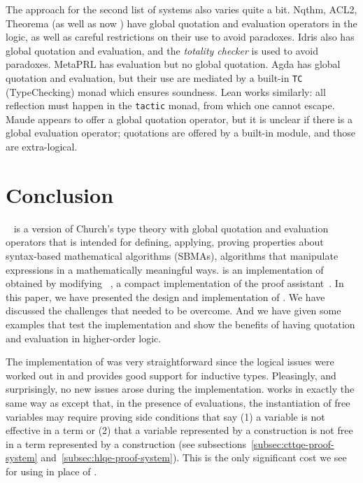 \documentclass[fleqn]{llncs}
\begin{document}
The approach for the second list of systems also varies quite a bit.
Nqthm, ACL2, Theorema (as well as now \HLQE) have global quotation
and evaluation operators in the logic, as well as careful restrictions
on their use to avoid paradoxes. Idris also has global quotation and
evaluation, and the \emph{totality checker} is used to avoid
paradoxes. MetaPRL has evaluation but no global quotation. Agda
has global quotation and evaluation, but their use are mediated by
a built-in \texttt{TC} (TypeChecking) monad which ensures soundness.
Lean works similarly: all reflection must happen in the \texttt{tactic}
monad, from which one cannot escape. Maude appears to offer a global
quotation operator, but it is unclear if there is a global evaluation
operator; quotations are offered by a built-in module, and those are
extra-logical.

\section{Conclusion}\label{sec:conclusion}

{\churchqe}~\cite{Farmer16,Farmer18} is a version of Church's
type theory with global quotation and evaluation operators that is
intended for defining, applying, proving properties about syntax-based
mathematical algorithms (SBMAs), algorithms that manipulate
expressions in a mathematically meaningful ways.  {\HLQE} is an
implementation of {\churchqe} obtained by modifying
{\HL}~\cite{Harrison09}, a compact implementation of the {\HOL} proof
assistant~\cite{GordonMelham93}.  In this paper, we have presented the
design and implementation of {\HLQE}.  We have discussed the
challenges that needed to be overcome.  And we have given some
examples that test the implementation and show the benefits of having
quotation and evaluation in higher-order logic.

The implementation of {\HLQE} was very straightforward since the
logical issues were worked out in {\churchqe} and {\HL} provides good
support for inductive types.  Pleasingly, and surprisingly, no new
issues arose during the implementation. {\HLQE} works in exactly the
same way as {\HL} except that, in the presence of evaluations, the 
instantiation of free variables may require proving side conditions 
that say (1) a variable is not effective in a term or (2) that a variable
represented by a construction is not free in a term represented by a
construction (see subsections~\ref{subsec:cttqe-proof-system}
and~\ref{subsec:hlqe-proof-system}).  This is the only significant
cost we see for using {\HLQE} in place of {\HL}.
\end{document}
